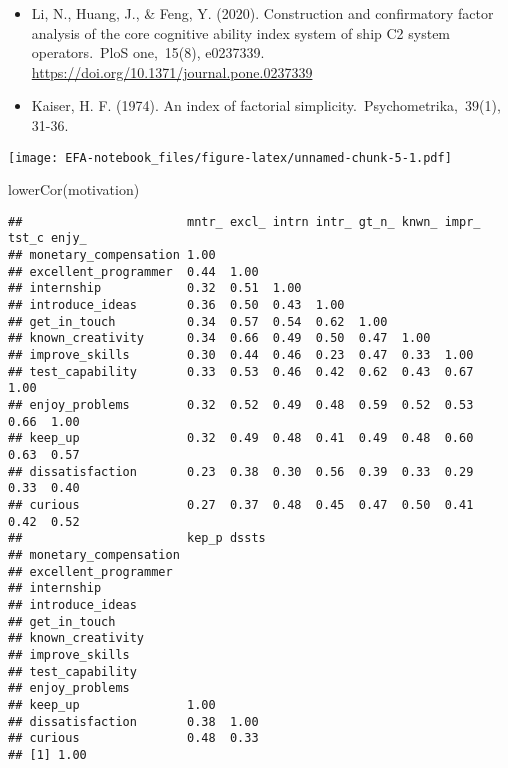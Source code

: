 \documentclass[
]{article}
\newenvironment{Shaded}{\begin{snugshade}}{\end{snugshade}}
\newcommand{\FunctionTok}[1]{\textcolor[rgb]{0.00,0.00,0.00}{#1}}
\newcommand{\NormalTok}[1]{#1}
\newcommand{\SpecialCharTok}[1]{\textcolor[rgb]{0.00,0.00,0.00}{#1}}
\begin{document}
\begin{itemize}
\item
  Li, N., Huang, J., \& Feng, Y. (2020). Construction and confirmatory
  factor analysis of the core cognitive ability index system of ship C2
  system operators.~PloS one,~15(8), e0237339.
  \url{https://doi.org/10.1371/journal.pone.0237339}
\item
  Kaiser, H. F. (1974). An index of factorial
  simplicity.~Psychometrika,~39(1), 31-36.
\end{itemize}

\begin{Shaded}
\end{Shaded}

\texttt{[image: EFA-notebook\_files/figure-latex/unnamed-chunk-5-1.pdf]}

\begin{Shaded}
\begin{Highlighting}[]
\FunctionTok{lowerCor}\NormalTok{(motivation)}
\end{Highlighting}
\end{Shaded}

\begin{verbatim}
##                       mntr_ excl_ intrn intr_ gt_n_ knwn_ impr_ tst_c enjy_
## monetary_compensation 1.00                                                 
## excellent_programmer  0.44  1.00                                           
## internship            0.32  0.51  1.00                                     
## introduce_ideas       0.36  0.50  0.43  1.00                               
## get_in_touch          0.34  0.57  0.54  0.62  1.00                         
## known_creativity      0.34  0.66  0.49  0.50  0.47  1.00                   
## improve_skills        0.30  0.44  0.46  0.23  0.47  0.33  1.00             
## test_capability       0.33  0.53  0.46  0.42  0.62  0.43  0.67  1.00       
## enjoy_problems        0.32  0.52  0.49  0.48  0.59  0.52  0.53  0.66  1.00 
## keep_up               0.32  0.49  0.48  0.41  0.49  0.48  0.60  0.63  0.57 
## dissatisfaction       0.23  0.38  0.30  0.56  0.39  0.33  0.29  0.33  0.40 
## curious               0.27  0.37  0.48  0.45  0.47  0.50  0.41  0.42  0.52 
##                       kep_p dssts
## monetary_compensation            
## excellent_programmer             
## internship                       
## introduce_ideas                  
## get_in_touch                     
## known_creativity                 
## improve_skills                   
## test_capability                  
## enjoy_problems                   
## keep_up               1.00       
## dissatisfaction       0.38  1.00 
## curious               0.48  0.33 
## [1] 1.00
\end{verbatim}
\end{document}
